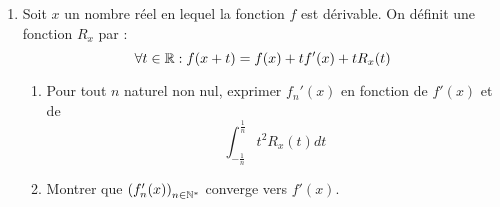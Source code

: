 \begin{enumerate}
\item Soit $x$ un nombre réel en lequel la fonction $f$ est dérivable. On définit une fonction $R_x$ par :
\begin{displaymath}
 \forall t\in \mathbb{R} : f(x+t) = f(x) + tf'(x) + tR_x(t) 
\end{displaymath}
\begin{enumerate}
 \item Pour tout $n$ naturel non nul, exprimer $f_n'(x)$ en fonction de $f'(x)$ et de
\begin{displaymath}
 \int_{-\frac{1}{n}}^{\frac{1}{n}}t^2R_x(t)dt
\end{displaymath}
\item Montrer que $\left(f_n'(x) \right)_{n\in\mathbb{N}^*}$ converge vers $f'(x)$.
\end{enumerate}

\end{enumerate}
